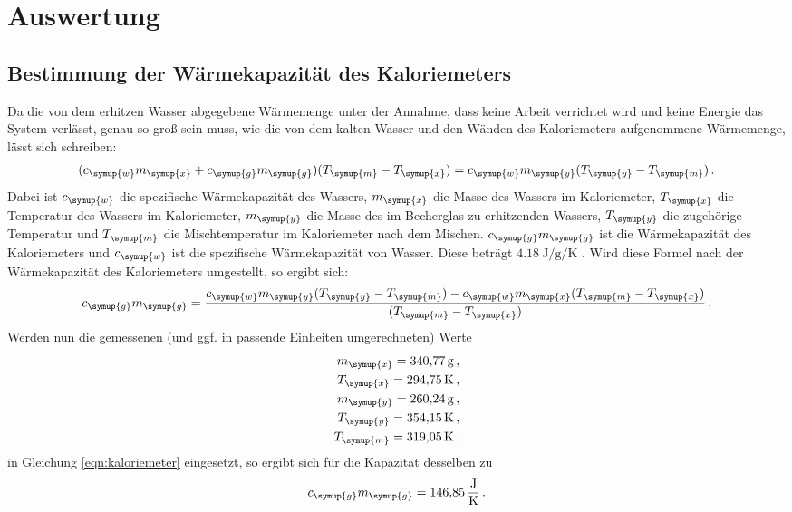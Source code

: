 \section{Auswertung}
\label{sec:Auswertung}

\subsection{Bestimmung der Wärmekapazität des Kaloriemeters}
\label{sec:Auswertung_Kaloriemeter}

Da die von dem erhitzen Wasser abgegebene Wärmemenge unter der Annahme, dass keine
Arbeit verrichtet wird und keine Energie das System verlässt, genau so groß sein
muss, wie die von dem kalten Wasser und den Wänden des Kaloriemeters aufgenommene
Wärmemenge, lässt sich schreiben:
\begin{equation}
  (c_{\symup{w}}m_{\symup{x}}+c_{\symup{g}}m_{\symup{g}})(T_{\symup{m}}-T_{\symup{x}})
  =c_{\symup{w}}m_{\symup{y}}(T_{\symup{y}}-T_{\symup{m}}) \,.
\end{equation}
Dabei ist $c_{\symup{w}}$ die spezifische Wärmekapazität des Wassers,
$m_{\symup{x}}$ die Masse des Wassers im Kaloriemeter, $T_{\symup{x}}$ die
Temperatur des Wassers im Kaloriemeter, $m_{\symup{y}}$ die Masse des
im Becherglas zu erhitzenden Wassers, $T_{\symup{y}}$ die zugehörige Temperatur
und $T_{\symup{m}}$ die Mischtemperatur im Kaloriemeter nach dem Mischen. $c_{\symup{g}}m_{\symup{g}}$
ist die Wärmekapazität des Kaloriemeters und $c_{\symup{w}}$ ist die spezifische Wärmekapazität
von Wasser. Diese beträgt $\SI{4.18}{\joule\per\gram\per\kelvin}$ \cite{Versuchsanleitung}.
Wird diese Formel nach der Wärmekapazität des Kaloriemeters umgestellt, so ergibt sich:
\begin{equation}
  c_{\symup{g}}m_{\symup{g}}=\frac{c_{\symup{w}}m_{\symup{y}}(T_{\symup{y}}-T_{\symup{m}})
  -c_{\symup{w}}m_{\symup{x}}(T_{\symup{m}}-T_{\symup{x}})}{(T_{\symup{m}}-T_{\symup{x}})} \,.
  \label{eqn:kaloriemeter}
\end{equation}
Werden nun die gemessenen (und ggf. in passende Einheiten umgerechneten) Werte
\begin{align*}
  m_{\symup{x}} = \SI{340.77}{\gram}   \,,\\
  T_{\symup{x}} = \SI{294.75}{\kelvin} \,,\\
  m_{\symup{y}} = \SI{260.24}{\gram}   \,,\\
  T_{\symup{y}} = \SI{354.15}{\kelvin} \,,\\
  T_{\symup{m}} = \SI{319.05}{\kelvin} \,.\\
\end{align*}
in Gleichung \eqref{eqn:kaloriemeter} eingesetzt, so ergibt sich für die Kapazität
desselben zu
\begin{equation}
  c_{\symup{g}}m_{\symup{g}} = \SI{146.85}{\joule\per\kelvin} \,.\nonumber
\end{equation}


